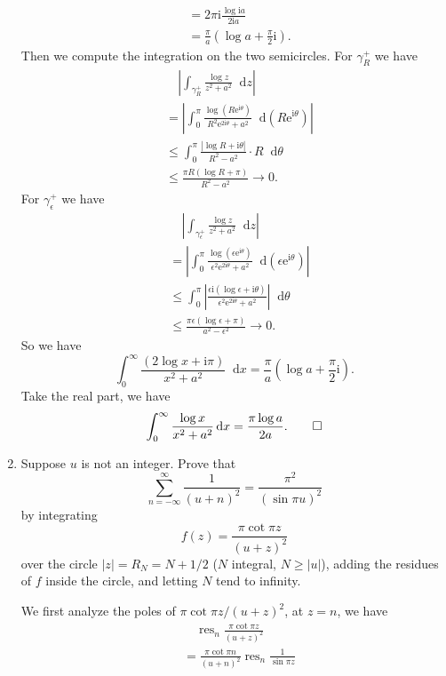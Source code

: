 \documentclass[11pt]{report}
\theoremstyle{mythm}
\let\oldendproof\endproof
\renewenvironment{proof}[1][\proofname]{%
  \oldproof[\normalfont \bfseries #1]%
}{\oldendproof}
\renewcommand*{\proofname}{Proof}
\theoremstyle{myans}
\newcommand{\mi}{\mathrm{i}}
\newcommand{\me}{\mathrm{e}}
\newcommand{\dd}{\mathop{}\!\mathrm{d}}
\DeclareMathOperator{\res}{res}
\begin{document}
\begin{enumerate}
\begin{proof}
\begin{align*}
      &= 2\pi \mi \frac{\log \mi a}{2\mi a}\\
      &= \frac{\pi}{a} \left(\log a + \frac{\pi}{2}\mi\right).
    \end{align*}
    Then we compute the integration on the two semicircles.
    For $\gamma_R^+$ we have
    \begin{align*}
      &\quad \left|\int_{\gamma_R^+} \frac{\log z}{z^2+a^2}\dd z\right|\\
      &= \left|\int_0^\pi \frac{\log (R\me^{\mi \theta})}{R^2\me^{2\mi \theta}+a^2}\dd (R\me^{\mi \theta})\right|\\
      &\leq \int_0^\pi \frac{\left|\log R + \mi \theta\right|}{R^2-a^2} \cdot R \dd \theta\\
      &\leq \frac{\pi R(\log R + \pi)}{R^2-a^2}\to 0.
    \end{align*}
    For $\gamma_\epsilon^+$ we have
    \begin{align*}
      &\quad \left|\int_{\gamma_\epsilon^+} \frac{\log z}{z^2+a^2}\dd z\right|\\
      &= \left|\int_0^\pi \frac{\log (\epsilon\me^{\mi \theta})}{\epsilon^2\me^{2\mi \theta}+a^2}\dd (\epsilon\me^{\mi \theta})\right|\\
      &\leq \int_0^\pi \left|\frac{\epsilon \mi (\log \epsilon + \mi \theta)}{\epsilon^2\me^{2\mi \theta}+a^2}\right| \dd \theta\\
      &\leq \frac{\pi\epsilon (\log \epsilon + \pi)}{a^2-\epsilon^2}\to 0.
    \end{align*}
    So we have
    \[ \int_0^\infty \frac{(2\log x + \mi \pi)}{x^2+a^2} \dd x = \frac{\pi}{a} \left(\log a + \frac{\pi}{2}\mi\right). \]
    Take the real part, we have 
    \[ \int_0^\infty \frac{\log x}{x^2+a^2} \dd x = \frac{\pi \log a}{2a}. \qedhere \]
  \end{proof}
  \setcounter{enumi}{11}
  \item Suppose $u$ is not an integer. Prove that
  \[ \sum_{n=-\infty}^\infty \frac 1{(u+n)^2} = \frac{\pi^2}{(\sin \pi u)^2} \]
  by integrating
  \[ f(z) = \frac{\pi \cot \pi z}{(u+z)^2} \]
  over the circle $|z| = R_N = N + 1/2$ ($N$ integral, $N \geq |u|$), adding the
  residues of $f$ inside the circle, and letting $N$ tend to infinity.
  \begin{proof}
    We first analyze the poles of $\pi \cot \pi z / (u+z)^2$, at $z=n$,
    we have
    \begin{align*}
      &\quad \res_n \frac{\pi \cot \pi z}{(u+z)^2}\\
      &= \frac{\pi \cot \pi n}{(u+n)^2} \res_n \frac 1{\sin \pi z}\\

\end{align*}
\end{proof}
\end{enumerate}
\end{document}
